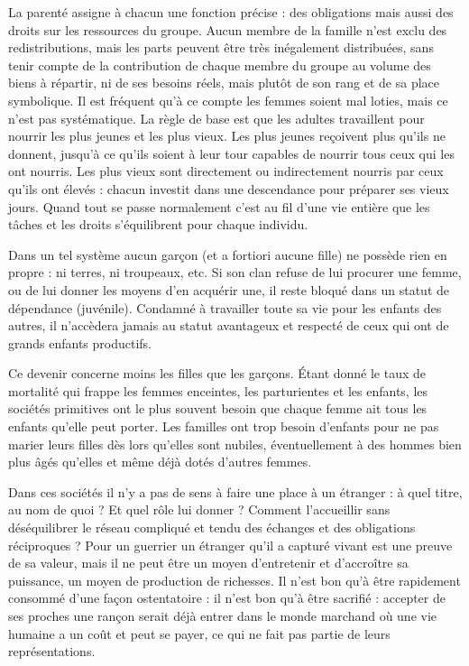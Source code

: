 La parenté assigne à chacun une fonction précise : des obligations 
mais aussi des droits sur les ressources du groupe. Aucun membre de la 
famille n'est exclu des redistributions, mais les parts peuvent être très 
inégalement distribuées, sans tenir compte de la contribution de chaque 
membre du groupe au volume des biens à répartir, ni de ses besoins
réels, mais plutôt de son rang et de sa place symbolique. Il est fréquent 
qu'à ce compte les femmes soient mal loties, mais ce n'est pas
systématique. La règle de base est que les adultes travaillent pour nourrir les plus 
jeunes et les plus vieux. Les plus jeunes reçoivent plus qu'ils ne donnent, 
jusqu'à ce qu'ils soient à leur tour capables de nourrir tous ceux qui les 
ont nourris. Les plus vieux sont directement ou indirectement nourris 
par ceux qu'ils ont élevés : chacun investit dans une descendance pour 
préparer ses vieux jours. Quand tout se passe normalement c'est au fil 
d'une vie entière que les tâches et les droits s'équilibrent pour chaque
individu.

Dans un tel système aucun garçon (et a fortiori aucune fille) ne 
possède rien en propre : ni terres, ni troupeaux, etc. Si son clan refuse de 
lui procurer une femme, ou de lui donner les moyens d'en acquérir une, 
il reste bloqué dans un statut de dépendance (juvénile). Condamné à
travailler toute sa vie pour les enfants des autres, il n'accèdera jamais au
statut avantageux et respecté de ceux qui ont de grands enfants productifs.

Ce devenir concerne moins les filles que les garçons. Étant donné 
le taux de mortalité qui frappe les femmes enceintes, les parturientes et 
les enfants, les sociétés primitives ont le plus souvent besoin que chaque 
femme ait tous les enfants qu'elle peut porter. Les familles ont trop
besoin d'enfants pour ne pas marier leurs filles dès lors qu'elles sont
nubiles, éventuellement à des hommes bien plus âgés qu'elles et même déjà 
dotés d'autres femmes.

Dans ces sociétés il n'y a pas de sens à faire une place à un
étranger : à quel titre, au nom de quoi ? Et quel rôle lui donner ? Comment 
l'accueillir sans déséquilibrer le réseau compliqué et tendu des échanges 
et des obligations réciproques ? Pour un guerrier un étranger qu'il a
capturé vivant est une preuve de sa valeur, mais il ne peut être un moyen 
d'entretenir et d'accroître sa puissance, un moyen de production de
richesses. Il n'est bon qu'à être rapidement consommé d'une façon
ostentatoire : il n'est bon qu'à être sacrifié : accepter de ses proches une
rançon serait déjà entrer dans le monde marchand où une vie humaine a un 
coût et peut se payer, ce qui ne fait pas partie de leurs représentations.

